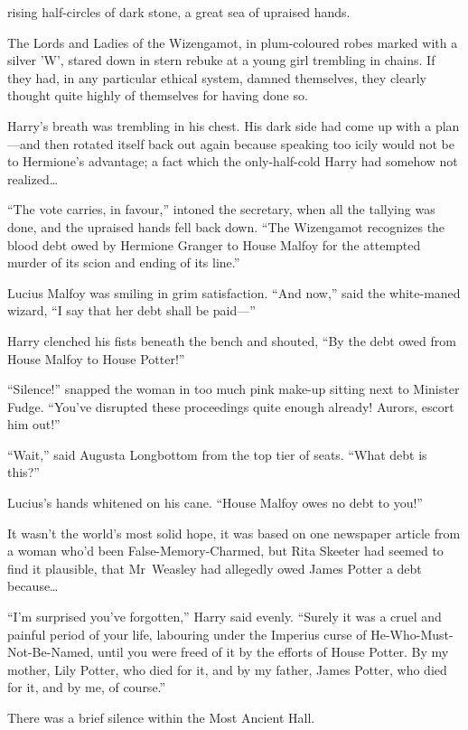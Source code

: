 
 rising half-circles of dark stone, a great sea of upraised hands.

\hplettrineextrapara
The Lords and Ladies of the Wizengamot, in plum-coloured robes marked with a silver ’W’, stared down in stern rebuke at a young girl trembling in chains. If they had, in any particular ethical system, damned themselves, they clearly thought quite highly of themselves for having done so.

Harry’s breath was trembling in his chest. His dark side had come up with a plan—and then rotated itself back out again because speaking too icily would not be to Hermione’s advantage; a fact which the only-half-cold Harry had somehow not realized…

“The vote carries, in favour,” intoned the secretary, when all the tallying was done, and the upraised hands fell back down. “The Wizengamot recognizes the blood debt owed by Hermione Granger to House Malfoy for the attempted murder of its scion and ending of its line.”

Lucius Malfoy was smiling in grim satisfaction. “And now,” said the white-maned wizard, “I say that her debt shall be paid—”

Harry clenched his fists beneath the bench and shouted, “By the debt owed from House Malfoy to House Potter!”

“Silence!” snapped the woman in too much pink make-up sitting next to Minister Fudge. “You’ve disrupted these proceedings quite enough already! Aurors, escort him out!”

“Wait,” said Augusta Longbottom from the top tier of seats. “What debt is this?”

Lucius’s hands whitened on his cane. “House Malfoy owes no debt to you!”

It wasn’t the world’s most solid hope, it was based on one newspaper article from a woman who’d been False-Memory-Charmed, but Rita Skeeter had seemed to find it plausible, that Mr~Weasley had allegedly owed James Potter a debt because…

“I’m surprised you’ve forgotten,” Harry said evenly. “Surely it was a cruel and painful period of your life, labouring under the Imperius curse of He-Who-Must-Not-Be-Named, until you were freed of it by the efforts of House Potter. By my mother, Lily Potter, who died for it, and by my father, James Potter, who died for it, and by me, of course.”

There was a brief silence within the Most Ancient Hall.

